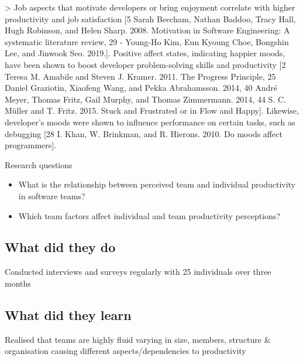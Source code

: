 > Job aspects that motivate developers or bring enjoyment correlate with higher productivity and job satisfaction [5 Sarah Beecham, Nathan Baddoo, Tracy Hall, Hugh Robinson, and Helen Sharp. 2008. Motivation in Software Engineering: A systematic literature review, 29 - Young-Ho Kim, Eun Kyoung Choe, Bongshin Lee, and Jinwook Seo. 2019.]. Positive affect states, indicating happier moods, have been shown to boost developer problem-solving skills and productivity [2 Teresa M. Amabile and Steven J. Kramer. 2011. The Progress Principle, 25 Daniel Graziotin, Xiaofeng Wang, and Pekka Abrahamsson. 2014, 40 André Meyer, Thomas Fritz, Gail Murphy, and Thomas Zimmermann. 2014, 44 S. C. Müller and T. Fritz. 2015. Stuck and Frustrated or in Flow and Happy]. Likewise, developer’s moods were shown to influence performance on certain tasks, such as debugging [28 I. Khan, W. Brinkman, and R. Hierons. 2010. Do moods affect programmers].

Research questions

\begin{itemize}
    \item What is the relationship between perceived team and individual productivity in software teams?
    \item Which team factors affect individual and team productivity perceptions?
\end{itemize}

\subsection{What did they do}

Conducted interviews and surveys regularly with 25 individuals over three months

\subsection{What did they learn}

Realised that teams are highly fluid varying in size, members, structure & organisation causing different aspects/dependencies to productivity
